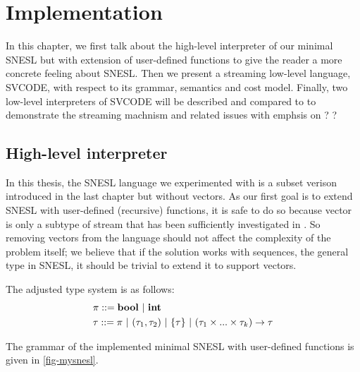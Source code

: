 \clearpage

\def\PRName#1{\textsc{Pre-#1}}
\newcommand\ra{\rightarrow}

\chapter{Implementation}

In this chapter, we first talk about the high-level interpreter of our minimal SNESL but with extension of user-defined functions to give the reader a more concrete feeling about SNESL. 
Then we present a streaming low-level language, SVCODE, with respect to its grammar, semantics and cost model.
Finally, two low-level interpreters of SVCODE will be described and compared to  to demonstrate the streaming machnism and related issues with emphsis on ? ?



\section{High-level interpreter}

In this thesis, the SNESL language we experimented with is a subset verison introduced in the last chapter but without vectors. 
As our first goal is to extend SNESL with user-defined (recursive) functions,
it is safe to do so because vector is only a subtype of stream that has been sufficiently investigated in \cite{Fphd}. 
So removing vectors from the language should not affect the complexity of the problem itself; we believe that if the solution works with sequences, the general type in SNESL, it should be trivial to extend it to support vectors. 

The adjusted type system is as follows:
\begin{align*} 
& \pi ::= \bool \ | \ \int  \\
& \tau ::= \pi \ | \ (\tau_1,\tau_2) \ | \ \tseq{\tau}  \ | \ (\tau_1 \times ... \times \tau_k) \rightarrow \tau 
\end{align*}

The grammar of the implemented minimal SNESL with user-defined functions is given in \ref{fig-mysnesl}. 
 

